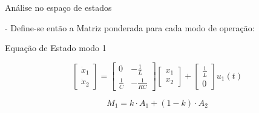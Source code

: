 \documentclass[aspectratio=169]{beamer}
\begin{document}
\begin{frame}{Análise no espaço de estados}

- Define-se então a Matriz ponderada para cada modo de operação:


 \begin{block}{Equação de Estado modo 1}
\begin{center}
    
      $$\begin{bmatrix} 
        \dot{x}_1 \\ 
        \dot{x}_2 
      \end{bmatrix} = 
      \begin{bmatrix} 
        0 & -\frac{1}{L} \\ 
        \frac{1}{C} & -\frac{1}{RC} 
      \end{bmatrix}
      \begin{bmatrix} 
        x_1 \\ 
        x_2 
      \end{bmatrix} + 
      \begin{bmatrix} 
        \frac{1}{L} \\ 
        0 
      \end{bmatrix} u_1(t)$$
    \end{center}
    
\begin{center}
      $$M_1 = k \cdot A_1 + (1 - k) \cdot A_2$$
    \end{center}
    
  \end{block}

 
\end{frame}
\end{document}
